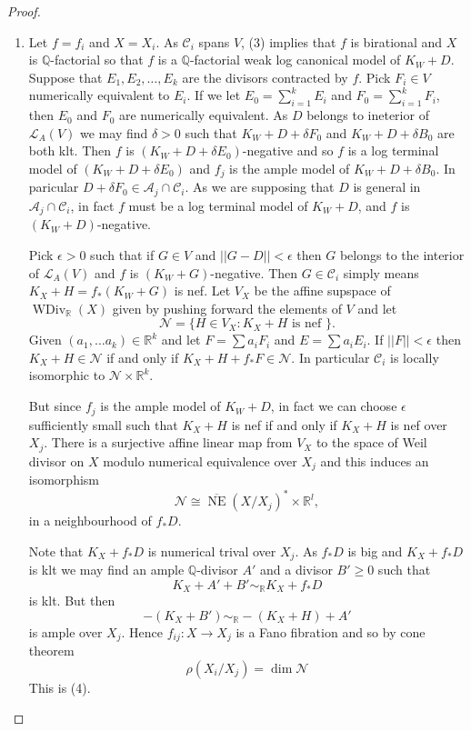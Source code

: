 \documentclass{article}
\begin{document}
\begin{proof}
\begin{enumerate}
  \item Let $f=f_{i}$ and $X=X_{i}$. As $\mathcal{C}_{i}$ spans $V$, (3) implies that $f$ is birational and $X$ is $\mathbb{Q}$-factorial so that $f$ is a $\mathbb{Q}$-factorial weak log canonical model of $K_{W}+D$. Suppose that $E_{1},E_{2},\ldots ,E_{k}$ are the divisors contracted by $f$.  Pick $F_{i} \in V$ numerically equivalent to $E_{i}$. If we let $E_{0}= \sum^{k}_{i=1} E_{i}$ and $F_{0}= \sum^{k}_{i=1}F_{i} $, then $E_{0}$ and $F_{0}$ are numerically equivalent. As $D$ belongs to ineterior of $\mathcal{L}_{A}(V)$ we may find $\delta>0$ such that $K_{W}+D+\delta F_{0}$ and $K_{W}+D+\delta B_{0}$ are both klt. Then $f$ is $(K_{W}+D+  \delta E_{0})$-negative and so $f$ is a log terminal model of $(K_{W}+D+  \delta E_{0})$ and $f_{j} $ is the ample model of $K_{W}+D+\delta B_{0}$. In paricular  $D+\delta F_{0} \in \mathcal{A}_{j} \cap \mathcal{C}_{i}$. As we are supposing that $D$ is general in $\mathcal{A}_{j} \cap  \mathcal{C}_{i}$, in fact $f$ must be a log terminal model of $K_{W}+D$, and $f$ is $(K_{W}+D)$-negative.    

    Pick $\epsilon>0 $ such that if $G \in V$ and $||G-D||< \epsilon$ then $G$ belongs to the interior of $\mathcal{L}_{A}(V)$ and $f$ is $(K_{W}+G)$-negative. Then $G \in \mathcal{C}_{i}$ simply means  $K_{X}+H=f_*(K_{W}+G)$ is nef. Let $V_{X}$ be the affine supspace of $\operatorname{WDiv}_{\mathbb{R}}(X)$ given by pushing forward the elements of $V$ and let 
    \[
      \mathcal{N}= \{H \in V_{X}: K_X +H \text{ is nef }\} 
   . \]
  Given $(a_{1},\ldots a_{k})\in \mathbb{R}^k$ and let $F =\sum a_{i}F_{i}$ and $E=\sum a_{i}E_{i}$. If $||F||<\epsilon$ then $K_{X}+H \in \mathcal{N}$ if and only if $K_{X}+H+f_*F \in \mathcal{N}$. In particular $\mathcal{C}_{i}$ is locally isomorphic to $\mathcal{N} \times \mathbb{R}^k$.

  But since $f_{j}$ is the ample model of $K_{W}+D$, in fact we can choose $\epsilon$ sufficiently small such that $K_{X}+H$ is nef if and only if $K_{X}+H$ is nef over $X_j$. There is a surjective  affine linear map from $V_{X}$ to the space of Weil divisor on $X$ modulo numerical equivalence over $X_{j}$ and this induces an isomorphism
  \[
    \mathcal{N} \cong \overline{\operatorname{NE}}(X/X_{j})^* \times \mathbb{R}^l,
  \]
 in a neighbourhood of $f_*D$.

 Note that $K_{X}+f_* D$ is numerical trival over $X_{j}$. As $f_*D$ is big and $K_{X}+f_*D$ is klt we may find an ample $\mathbb{Q}$-divisor $A'$ and a divisor $B'\geqslant 0$ such that 
 \[
   K_{X}+A'+B' \sim_{\mathbb{R}} K_{X}+f_*D 
 \]
is klt. But then 
\[
  -(K_{X}+B')\sim_{\mathbb{R}}-(K_{X}+H)+A'
\]
is ample over $X_{j}$. Hence $f_{ij}:X\to X_{j}$ is a Fano fibration and so by cone theorem 
\[
  \rho(X_{i}/X_{j})=\dim \mathcal{N}
\]
This is (4).
  \end{enumerate}
\end{proof}
\end{document}
